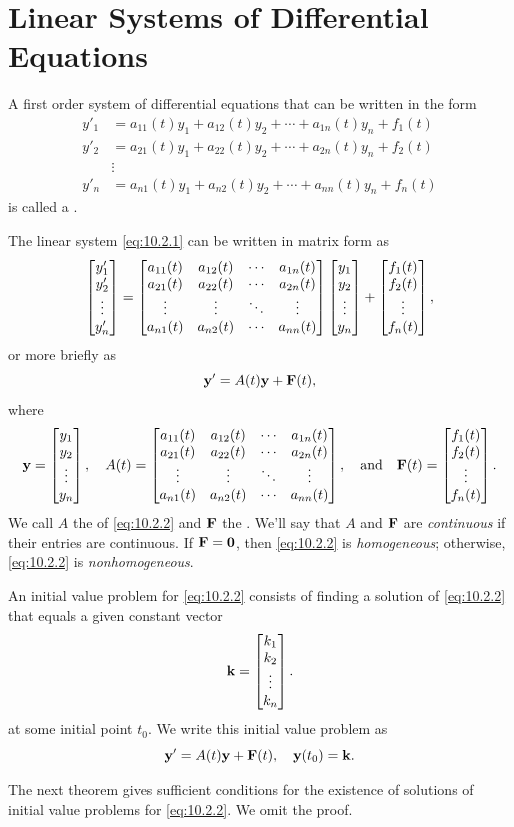 \section{Linear Systems of Differential Equations}\label{sec:linear_systems}

A  first order system of  differential equations that can be written in
the form
\begin{equation} \label{eq:10.2.1}
\begin{aligned}
y'_1&=a_{11}(t)y_1+a_{12}(t)y_2+\cdots+a_{1n}(t)y_n+f_1(t)\\
y'_2&=a_{21}(t)y_1+a_{22}(t)y_2+\cdots+a_{2n}(t)y_n+f_2(t)\\
&\vdots\\
y'_n&=a_{n1}(t)y_1+a_{n2}(t)y_2+\cdots+a_{nn}(t)y_n+f_n(t)
\end{aligned}
\end{equation}
is called a .

The linear system \eqref{eq:10.2.1}  can be written in matrix form as
\[
\begin{bmatrix}y'_1\\y'_2\\\vdots\\y'_n\end{bmatrix}=\begin{bmatrix}a_{11}(t)&a_{12}(t)&\cdots &a_{1n}(t)\\a_{21}(t)&a_{22}(t)&\cdots&a_{2n}(t)\\\vdots& \vdots&\ddots&\vdots\\a_{n1}(t)&a_{n2}(t)&\cdots&a_{nn}(t) \end{bmatrix}\begin{bmatrix}y_1\\y_2\\\vdots\\y_n\end{bmatrix}+\begin{bmatrix}f_1(t)\\f_2(t)\\\vdots\\f_n(t)\end{bmatrix},
\]
or more briefly as
\begin{equation} \label{eq:10.2.2}
\mathbf{y}'=A(t)\mathbf{y}+\mathbf{F}(t),
\end{equation}
where
\[
\mathbf{y}=\begin{bmatrix}y_1\\y_2\\\vdots\\y_n\end{bmatrix},\quad
A(t)=\begin{bmatrix}a_{11}(t)&a_{12}(t)&\cdots &a_{1n}(t)\\a_{21}(t)&a_{22}(t)&\cdots&a_{2n}(t)\\\vdots& \vdots&\ddots&\vdots\\a_{n1}(t)&a_{n2}(t)&\cdots&a_{nn}(t) \end{bmatrix},\quad\text{and}\quad \mathbf{F}(t)=\begin{bmatrix}f_1(t)\\f_2(t)\\\vdots\\f_n(t)\end{bmatrix}.
\]
We call $A$  the  of \eqref{eq:10.2.2} and
$\mathbf{F}$  the .   We'll say that $A$
and $\mathbf{F}$ are \emph{\color{blue}continuous} if their entries are continuous.
If $\mathbf{F}=\mathbf{0}$, then \eqref{eq:10.2.2} is
\emph{\color{blue}homogeneous};
otherwise, \eqref{eq:10.2.2} is
\emph{\color{blue}nonhomogeneous}.

An  initial value problem  for \eqref{eq:10.2.2} consists of
finding a solution of \eqref{eq:10.2.2} that equals a given constant
vector
\[
\mathbf{k} =\begin{bmatrix}k_1\\k_2\\\vdots\\k_n\end{bmatrix}.
\]
at some initial point $t_0$. We write this initial value problem as
\[
\mathbf{y}'=A(t)\mathbf{y}+\mathbf{F}(t), \quad  \mathbf{y}(t_0)=\mathbf{k}.
\]

The next theorem gives sufficient conditions for the existence
of solutions of initial value problems for \eqref{eq:10.2.2}. We omit the
proof.

